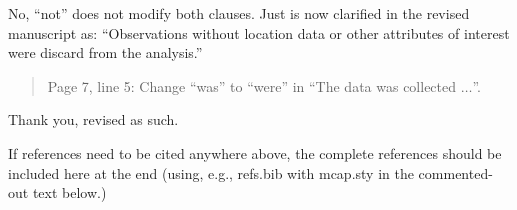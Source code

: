 \documentclass[12pt]{article}
\newenvironment{comment}%
{\begin{quotation}\small\it\noindent\ignorespaces%
}{\end{quotation}}
\begin{document}
No, ``not'' does not modify both clauses.  Just is now clarified in the revised
manuscript as: ``Observations without location data or other attributes of 
interest were discard from the analysis.'' 

\begin{comment}
\item Page 7, line 5: Change ``was'' to ``were'' in ``The data was collected 
$\ldots$''.
\end{comment}

Thank you, revised as such.  

\bigskip

If references need to be cited anywhere above, the complete references should be 
included here at the end (using, e.g., refs.bib with mcap.sty in the 
commented-out text below.)

%
% 
\end{document}
